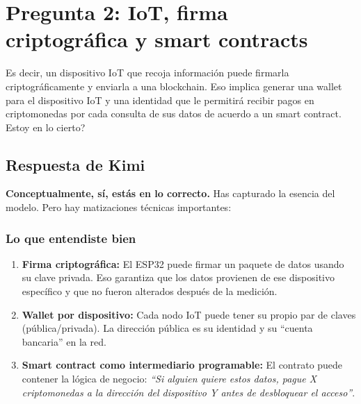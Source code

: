 \documentclass[12pt,a4paper]{article}
\begin{document}
\section{Pregunta 2: IoT, firma criptogr\'{a}fica y smart contracts}

\begin{tcolorbox}[colback=green!5!white,colframe=green!75!black,title={\textbf{Pregunta del Profesor CERO}}]
Es decir, un dispositivo IoT que recoja informaci\'{o}n puede firmarla criptogr\'{a}ficamente y enviarla a una blockchain. Eso implica generar una wallet para el dispositivo IoT y una identidad que le permitir\'{a} recibir pagos en criptomonedas por cada consulta de sus datos de acuerdo a un smart contract. \textquestiondown Estoy en lo cierto?
\end{tcolorbox}

\subsection{Respuesta de Kimi}

\textbf{Conceptualmente, s\'{i}, est\'{a}s en lo correcto.} Has capturado la esencia del modelo. Pero hay matizaciones t\'{e}cnicas importantes:

\subsubsection{Lo que entendiste bien}
\begin{enumerate}
    \item \textbf{Firma criptogr\'{a}fica:} El ESP32 puede firmar un paquete de datos usando su clave privada. Eso garantiza que los datos provienen de ese dispositivo espec\'{i}fico y que no fueron alterados despu\'{e}s de la medici\'{o}n.
    \item \textbf{Wallet por dispositivo:} Cada nodo IoT puede tener su propio par de claves (p\'{u}blica/privada). La direcci\'{o}n p\'{u}blica es su identidad y su ``cuenta bancaria'' en la red.
    \item \textbf{Smart contract como intermediario programable:} El contrato puede contener la l\'{o}gica de negocio: \textit{``Si alguien quiere estos datos, pague X criptomonedas a la direcci\'{o}n del dispositivo Y antes de desbloquear el acceso''}.
\end{enumerate}
\end{document}
